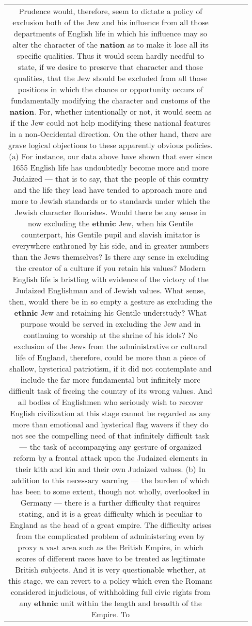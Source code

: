 \documentclass[11pt]{article}
\newlength\mylength
\begin{document}
\begin{center}
\begin{longtable}{|C{.65\mylength}|C{.30\mylength}|C{.12\mylength}|C{.12\mylength}|C{.12\mylength}|}
  \small Prudence would, therefore, seem to dictate a policy of exclusion both of the Jew and his influence from all those departments of English life in which his influence may so alter the character of the \textbf{nation} as to make it lose all its specific qualities.    Thus it would seem hardly needful to state, if we desire to preserve that character and those qualities, that the Jew should be excluded from all those positions in which the chance or opportunity occurs of fundamentally modifying the character and customs of the \textbf{nation}. For, whether intentionally or not, it would seem as if the Jew could not help modifying these national features in a non-Occidental direction.    On the other hand, there are grave logical objections to these apparently obvious policies. (a) For instance, our data above have shown that ever since 1655 English life has undoubtedly become more and more Judaized — that is to say, that the people of this country and the life they lead have tended to approach more and more to Jewish standards or to standards under which the Jewish character flourishes.    Would there be any sense in now excluding the \textbf{ethnic} Jew, when his Gentile counterpart, his Gentile pupil and slavish imitator is everywhere enthroned by his side, and in greater numbers than the Jews themselves?    Is there any sense in excluding the creator of a culture if you retain his values?    Modern English life is bristling with evidence of the victory of the Judaized Englishman and of Jewish values. What sense, then, would there be in so empty a gesture as excluding the \textbf{ethnic} Jew and retaining his Gentile understudy? What purpose would be served in excluding the Jew and in continuing to worship at the shrine of his idols?    No exclusion of the Jews from the administrative or cultural life of England, therefore, could be more than a piece of shallow, hysterical patriotism, if it did not contemplate and include the far more fundamental but infinitely more difficult task of freeing the country of its wrong values. And all bodies of Englishmen who seriously wish to recover English civilization at this stage cannot be regarded as any more than emotional and hysterical flag wavers if they do not see the compelling need of that infinitely difficult task — the task of accompanying any gesture of organized reform by a frontal attack upon the Judaized elements in their kith and kin and their own Judaized values.    (b) In addition to this necessary warning — the burden of which has been to some extent, though not wholly, overlooked in Germany — there is a further difficulty that requires stating, and it is a great difficulty which is peculiar to England as the head of a great empire.    The difficulty arises from the complicated problem of administering even by proxy a vast area such as the British Empire, in which scores of different races have to be treated as legitimate British subjects. And it is very questionable whether, at this stage, we can revert to a policy which even the Romans considered injudicious, of withholding full civic rights from any \textbf{ethnic} unit within the length and breadth of the Empire. To 
\end{longtable}
\end{center}
\end{document}
